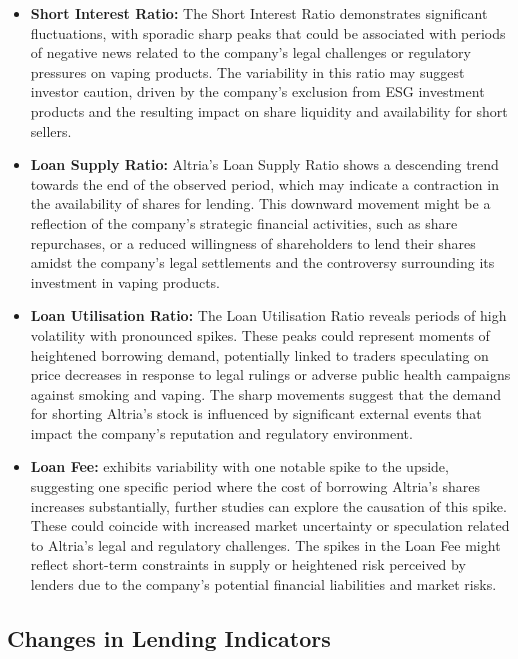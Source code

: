 \begin{itemize}
	\item\textbf{Short Interest Ratio:} The Short Interest Ratio demonstrates significant fluctuations, with sporadic sharp peaks that could be associated with periods of negative news related to the company’s legal challenges or regulatory pressures on vaping products. The variability in this ratio may suggest investor caution, driven by the company's exclusion from ESG investment products and the resulting impact on share liquidity and availability for short sellers.
	\item\textbf{Loan Supply Ratio:} Altria's Loan Supply Ratio shows a descending trend towards the end of the observed period, which may indicate a contraction in the availability of shares for lending. This downward movement might be a reflection of the company's strategic financial activities, such as share repurchases, or a reduced willingness of shareholders to lend their shares amidst the company's legal settlements and the controversy surrounding its investment in vaping products.
	\item\textbf{Loan Utilisation Ratio:} The Loan Utilisation Ratio reveals periods of high volatility with pronounced spikes. These peaks could represent moments of heightened borrowing demand, potentially linked to traders speculating on price decreases in response to legal rulings or adverse public health campaigns against smoking and vaping. The sharp movements suggest that the demand for shorting Altria's stock is influenced by significant external events that impact the company's reputation and regulatory environment.
	\item\textbf{Loan Fee:} exhibits variability with one notable spike to the upside, suggesting one specific period where the cost of borrowing Altria's shares increases substantially, further studies can explore the causation of this spike. These could coincide with increased market uncertainty or speculation related to Altria’s legal and regulatory challenges. The spikes in the Loan Fee might reflect short-term constraints in supply or heightened risk perceived by lenders due to the company's potential financial liabilities and market risks.
\end{itemize}

\subsection{Changes in Lending Indicators}

